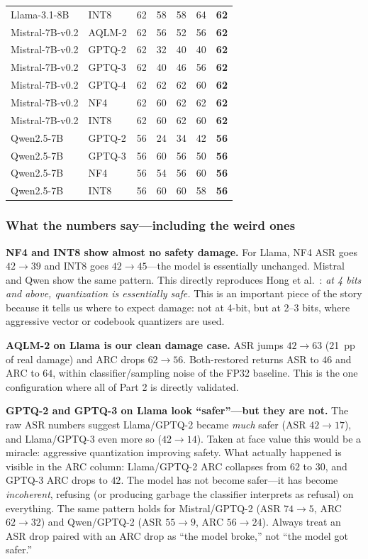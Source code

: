 \documentclass[11pt]{article}
\begin{document}
\begin{center}
\begin{tabular}{llrrrrr}
Llama-3.1-8B    & INT8    & 62 & 58 & 58 & 64 & \textbf{62} \\
Mistral-7B-v0.2 & AQLM-2  & 62 & 56 & 52 & 56 & \textbf{62} \\
Mistral-7B-v0.2 & GPTQ-2  & 62 & 32 & 40 & 40 & \textbf{62} \\
Mistral-7B-v0.2 & GPTQ-3  & 62 & 40 & 46 & 56 & \textbf{62} \\
Mistral-7B-v0.2 & GPTQ-4  & 62 & 62 & 62 & 60 & \textbf{62} \\
Mistral-7B-v0.2 & NF4     & 62 & 60 & 62 & 62 & \textbf{62} \\
Mistral-7B-v0.2 & INT8    & 62 & 60 & 62 & 60 & \textbf{62} \\
Qwen2.5-7B      & GPTQ-2  & 56 & 24 & 34 & 42 & \textbf{56} \\
Qwen2.5-7B      & GPTQ-3  & 56 & 60 & 56 & 50 & \textbf{56} \\
Qwen2.5-7B      & NF4     & 56 & 54 & 56 & 60 & \textbf{56} \\
Qwen2.5-7B      & INT8    & 56 & 60 & 60 & 58 & \textbf{56} \\
\bottomrule
\end{tabular}
\end{center}

\subsubsection{What the numbers say---including the weird ones}

\textbf{NF4 and INT8 show almost no safety damage.} For Llama, NF4 ASR goes $42\rightarrow 39$ and INT8 goes $42\rightarrow 45$---the model is essentially unchanged. Mistral and Qwen show the same pattern. This directly reproduces Hong et al.~\cite{hong2024compressed}: \emph{at 4 bits and above, quantization is essentially safe.} This is an important piece of the story because it tells us where to expect damage: not at 4-bit, but at 2--3 bits, where aggressive vector or codebook quantizers are used.

\textbf{AQLM-2 on Llama is our clean damage case.} ASR jumps $42\rightarrow 63$ (21~pp of real damage) and ARC drops $62\rightarrow 56$. Both-restored returns ASR to $46$ and ARC to $64$, within classifier/sampling noise of the FP32 baseline. This is the one configuration where all of Part 2 is directly validated.

\textbf{GPTQ-2 and GPTQ-3 on Llama look ``safer''---but they are not.} The raw ASR numbers suggest Llama/GPTQ-2 became \emph{much} safer (ASR $42\rightarrow 17$), and Llama/GPTQ-3 even more so ($42\rightarrow 14$). Taken at face value this would be a miracle: aggressive quantization improving safety. What actually happened is visible in the ARC column: Llama/GPTQ-2 ARC collapses from $62$ to $30$, and GPTQ-3 ARC drops to $42$. The model has not become safer---it has become \emph{incoherent}, refusing (or producing garbage the classifier interprets as refusal) on everything. The same pattern holds for Mistral/GPTQ-2 (ASR $74\rightarrow 5$, ARC $62\rightarrow 32$) and Qwen/GPTQ-2 (ASR $55\rightarrow 9$, ARC $56\rightarrow 24$). Always treat an ASR drop paired with an ARC drop as ``the model broke,'' not ``the model got safer.''
\end{document}

